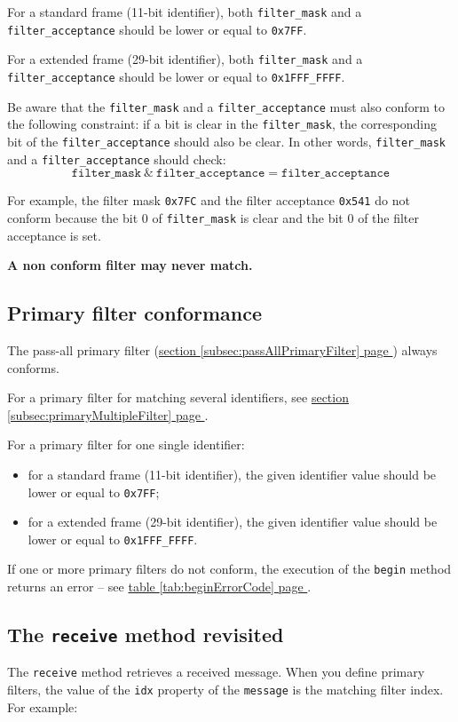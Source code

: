 \documentclass[9pt, a4paper, obeyspaces, openany]{extarticle}
\newcommand \subsectionLabel[2]{\subsection{#1}\label{subsec:#2}}
\newcommand\refSubsectionPage[1]{\hyperref[subsec:#1]{section \ref*{subsec:#1} page \pageref{subsec:#1}}}
\newcommand\refTableauPage[1]{\hyperref[tab:#1]{table \ref*{tab:#1} page \pageref{tab:#1}}}
\begin{document}
For a standard frame (11-bit identifier), both \texttt{filter\_mask} and a \texttt{filter\_acceptance} should be lower or equal to \texttt{0x7FF}.

For a extended frame (29-bit identifier), both \texttt{filter\_mask} and a \texttt{filter\_acceptance} should be lower or equal to \texttt{0x1FFF\_FFFF}.

Be aware that the \texttt{filter\_mask} and a \texttt{filter\_acceptance} must also conform to the following constraint: if a bit is clear in the \texttt{filter\_mask}, the corresponding bit of the \texttt{filter\_acceptance} should also be clear. In other words, \texttt{filter\_mask} and a \texttt{filter\_acceptance} should check:
\begin{equation*}
  \texttt{filter\_mask}~\&~\texttt{filter\_acceptance} = \texttt{filter\_acceptance}
\end{equation*}

For example, the filter mask \texttt{0x7FC} and the filter acceptance \texttt{0x541} do not conform because the bit 0 of \texttt{filter\_mask} is clear and the bit 0 of the filter acceptance is set.

{\bf A non conform filter may never match.}




\subsectionLabel{Primary filter conformance}{primaryFilterConformance}

The pass-all primary filter (\refSubsectionPage{passAllPrimaryFilter}) always conforms.

For a primary filter for matching several identifiers, see \refSubsectionPage{primaryMultipleFilter}.

For a primary filter for one single identifier:
\begin{itemize}
  \item for a standard frame (11-bit identifier), the given identifier value should be lower or equal to \texttt{0x7FF};
  \item for a extended frame (29-bit identifier), the given identifier value should be lower or equal to \texttt{0x1FFF\_FFFF}.
\end{itemize}

If one or more primary filters do not conform, the execution of the \texttt{begin} method returns an error -- see \refTableauPage{beginErrorCode}.


\subsectionLabel{The \texttt{receive} method revisited}{usingIDXvalue}

The \texttt{receive} method retrieves a received message. When you define primary filters, the value of the \texttt{idx} property of the \texttt{message} is the matching filter index. For example:
\end{document}
